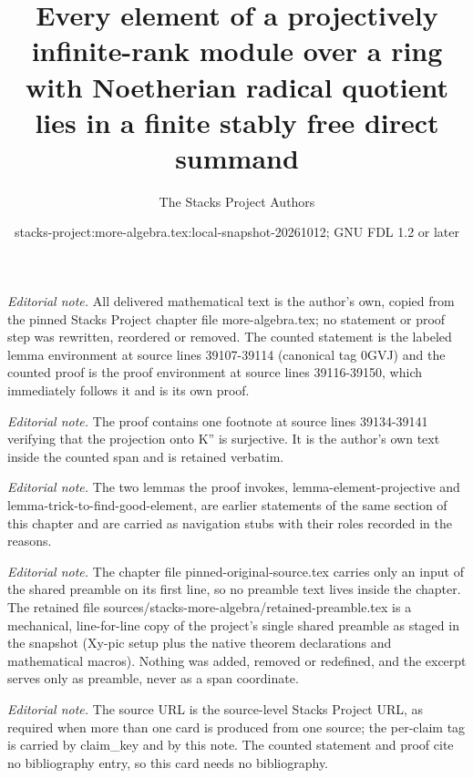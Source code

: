 \documentclass[10pt,a4paper]{amsart}
\title{Every element of a projectively infinite-rank module over a ring with Noetherian radical quotient lies in a finite stably free direct summand}
\author{The Stacks Project Authors}
\date{stacks-project:more-algebra.tex:local-snapshot-20261012; GNU FDL 1.2 or later}
\theoremstyle{plain}
\theoremstyle{definition}
\theoremstyle{remark}
\numberwithin{equation}{subsection}
\begin{document}
\maketitle
\setcounter{subsection}{1}
\noindent\textit{Editorial note.} All delivered mathematical text is the author's own, copied from the pinned Stacks Project chapter file more-algebra.tex; no statement or proof step was rewritten, reordered or removed. The counted statement is the labeled lemma environment at source lines 39107-39114 (canonical tag 0GVJ) and the counted proof is the proof environment at source lines 39116-39150, which immediately follows it and is its own proof.\par\medskip
\noindent\textit{Editorial note.} The proof contains one footnote at source lines 39134-39141 verifying that the projection onto K'' is surjective. It is the author's own text inside the counted span and is retained verbatim.\par\medskip
\noindent\textit{Editorial note.} The two lemmas the proof invokes, lemma-element-projective and lemma-trick-to-find-good-element, are earlier statements of the same section of this chapter and are carried as navigation stubs with their roles recorded in the reasons.\par\medskip
\noindent\textit{Editorial note.} The chapter file pinned-original-source.tex carries only an input of the shared preamble on its first line, so no preamble text lives inside the chapter. The retained file sources/stacks-more-algebra/retained-preamble.tex is a mechanical, line-for-line copy of the project's single shared preamble as staged in the snapshot (Xy-pic setup plus the native theorem declarations and mathematical macros). Nothing was added, removed or redefined, and the excerpt serves only as preamble, never as a span coordinate.\par\medskip
\noindent\textit{Editorial note.} The source URL is the source-level Stacks Project URL, as required when more than one card is produced from one source; the per-claim tag is carried by claim\_key and by this note. The counted statement and proof cite no bibliography entry, so this card needs no bibliography.\par\medskip
\end{document}
